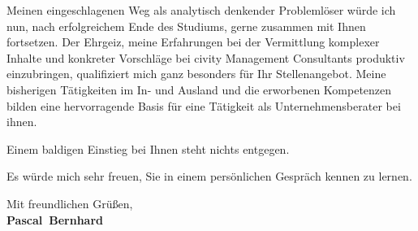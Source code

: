 \documentclass[11pt,a4paper]{article}
\def\firstname{Pascal}
\def\familyname{Bernhard}
\begin{document}
Meinen eingeschlagenen Weg als analytisch denkender Problemlöser würde ich nun, nach erfolgreichem Ende des Studiums, gerne zusammen mit Ihnen fortsetzen.
Der Ehrgeiz, meine Erfahrungen bei der Vermittlung komplexer Inhalte und konkreter Vorschläge bei civity Management Consultants produktiv einzubringen, qualifiziert mich ganz besonders für Ihr Stellenangebot. Meine bisherigen Tätigkeiten im In- und Ausland und die erworbenen Kompetenzen bilden eine hervorragende Basis für eine Tätigkeit als Unternehmensberater bei ihnen.


Einem baldigen Einstieg bei Ihnen steht nichts entgegen.


Es würde mich sehr freuen, Sie in einem persönlichen Gespräch kennen zu lernen.

  
Mit freundlichen Grüßen,\\[3em] %
%
{\bfseries \firstname~\familyname}\\
%
\end{document}
